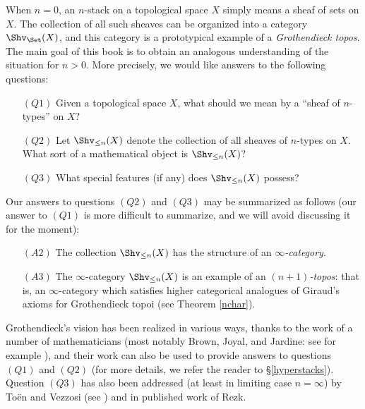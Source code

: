 When $n=0$, an $n$-stack on a topological space $X$ simply means a sheaf of sets on $X$.
The collection of all such sheaves can be organized into a category $\Shv_{\Set}(X)$, and this category is a prototypical example of a {\it Grothendieck topos}. The main goal of this book is to obtain an analogous understanding of the situation for $n > 0$. More precisely, we would like answers to the following questions:
\begin{itemize}
\item[$(Q1)$] Given a topological space $X$, what should we mean by a ``sheaf of $n$-types'' on $X$?

\item[$(Q2)$] Let $\Shv_{\leq n}(X)$ denote the collection of all sheaves of $n$-types on $X$.
What sort of a mathematical object is $\Shv_{\leq n}(X)$?

\item[$(Q3)$] What special features (if any) does $\Shv_{\leq n}(X)$ possess?
\end{itemize}

Our answers to questions $(Q2)$ and $(Q3)$ may be summarized as follows
(our answer to $(Q1)$ is more difficult to summarize, and we will avoid discussing it for the moment):

\begin{itemize}
\item[$(A2)$] The collection $\Shv_{\leq n}(X)$ has the structure of an
{\it $\infty$-category}.
\item[$(A3)$] The $\infty$-category $\Shv_{\leq n}(X)$ is an example of
an {\it $(n+1)$-topos}: that is, an $\infty$-category which satisfies
higher categorical analogues of Giraud's axioms for Grothendieck topoi
(see Theorem \ref{nchar}).
\end{itemize}

\begin{remark2}
Grothendieck's vision has been realized in various ways, thanks to the work of a number of mathematicians (most notably Brown, Joyal, and Jardine: see for example \cite{jardine}), and their work can also be used to provide answers to questions $(Q1)$ and $(Q2)$ (for more details, we refer the reader to \S \ref{hyperstacks}). Question $(Q3)$ has also been addressed (at least in limiting case $n = \infty$) by To\"{e}n and Vezzosi (see \cite{toen}) and in published work of Rezk. 
\end{remark2}

